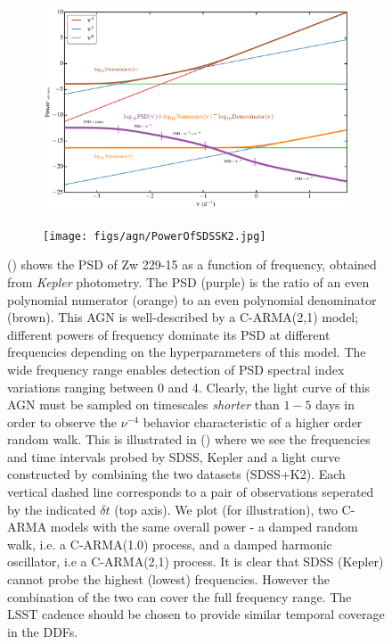 \begin{figure}
  \begin{subfigure}[t]{0.5\textwidth}
    \centering\includegraphics[width=0.9\linewidth]{figs/agn/AGN_Variability_01.pdf}
    \centering
    \caption{}
    \label{fig:PSDvsFreq}
  \end{subfigure}
  \begin{subfigure}[t]{0.5\textwidth}
    \centering\texttt{[image: figs/agn/PowerOfSDSSK2.jpg]}
    \centering
    \caption{}
    \label{fig:SDSSK2Power}
  \end{subfigure}
  \caption{() shows the PSD of Zw 229-15 as a function of frequency,
  obtained from {\em Kepler} photometry. The PSD (purple) is the ratio of an even
  polynomial numerator (orange) to an even polynomial denominator (brown).
  This AGN is well-described by a C-ARMA(2,1) model; different powers of frequency
  dominate its PSD at different frequencies depending on the hyperparameters of
  this model. The wide frequency range enables detection of PSD spectral index variations
  ranging between 0 and 4. Clearly, the light curve of this AGN must be sampled on
  timescales {\em shorter} than $1-5$ days in order to observe the $\nu^{-4}$ behavior
  characteristic of a higher order random walk. This is illustrated in ()
  where we see the frequencies and time intervals probed by SDSS, Kepler and a light curve
  constructed by combining the two datasets (SDSS+K2). Each vertical dashed line corresponds to
  a pair of observations seperated by the indicated $\delta t$ (top axis). We plot (for
  illustration), two C-ARMA models with the same overall power - a damped random walk, i.e. a
  C-ARMA(1.0) process, and a damped harmonic oscillator, i.e a C-ARMA(2,1) process.
  It is clear that SDSS (Kepler) cannot probe the highest (lowest) frequencies. However the
  combination of the two can cover the full frequency range. The LSST cadence should be chosen
  to provide similar temporal coverage in the DDFs.}
  \label{PSDvsFreq}
\end{figure}

